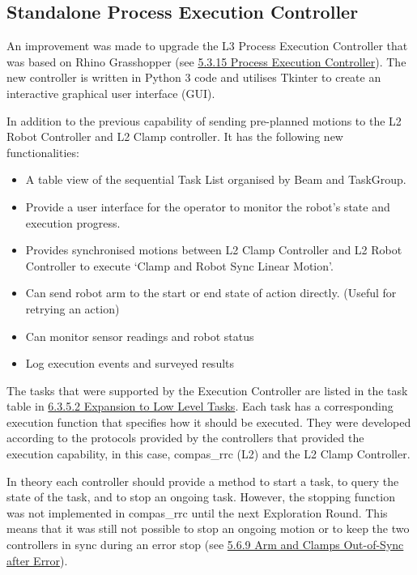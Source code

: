 \subsection{Standalone Process Execution Controller}
\label{subsection:exploration_3_standalone_process_execution_controller}

An improvement was made to upgrade the L3 Process Execution Controller that was based on Rhino Grasshopper (see \ul{5.3.15 Process Execution Controller}). The new controller is written in Python 3 code and utilises Tkinter to create an interactive graphical user interface (GUI).




In addition to the previous capability of sending pre-planned motions to the L2 Robot Controller and L2 Clamp controller. It has the following new functionalities:

\begin{itemize}
	\item A table view of the sequential Task List organised by Beam and TaskGroup. 

	\item Provide a user interface for the operator to monitor the robot's state and execution progress.

	\item Provides synchronised motions between L2 Clamp Controller and L2 Robot Controller to execute ‘Clamp and Robot Sync Linear Motion’.

	\item Can send robot arm to the start or end state of action directly. (Useful for retrying an action)

	\item Can monitor sensor readings and robot status

	\item Log execution events and surveyed results

\end{itemize}
The tasks that were supported by the Execution Controller are listed in the task table in \ul{6.3.5.2 Expansion to Low Level Tasks}. Each task has a corresponding execution function that specifies how it should be executed. They were developed according to the protocols provided by the controllers that provided the execution capability, in this case, compas\_rrc (L2) and the L2 Clamp Controller. 

In theory each controller should provide a method to start a task, to query the state of the task, and to stop an ongoing task. However, the stopping function was not implemented in compas\_rrc until the next Exploration Round. This means that it was still not possible to stop an ongoing motion or to keep the two controllers in sync during an error stop (see \ul{5.6.9 Arm and Clamps Out-of-Sync after Error}).

